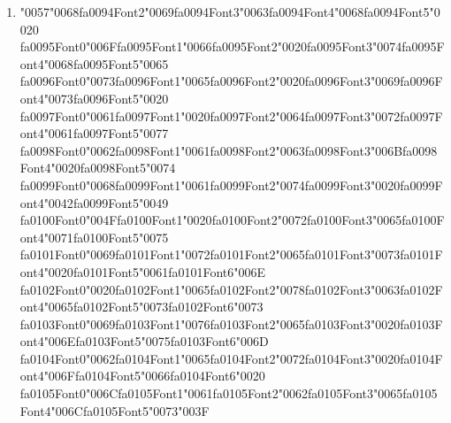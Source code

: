\documentclass[11pt]{article}
\begin{document}
\begin{enumerate}[label=Q\arabic*., leftmargin=*]
\item {\char"0057}{\char"0068}{\csname fa0094Font2\endcsname\char"0069}{\csname fa0094Font3\endcsname\char"0063}{\csname fa0094Font4\endcsname\char"0068}{\csname fa0094Font5\endcsname\char"0020} {\csname fa0095Font0\endcsname\char"006F}{\csname fa0095Font1\endcsname\char"0066}{\csname fa0095Font2\endcsname\char"0020}{\csname fa0095Font3\endcsname\char"0074}{\csname fa0095Font4\endcsname\char"0068}{\csname fa0095Font5\endcsname\char"0065} {\csname fa0096Font0\endcsname\char"0073}{\csname fa0096Font1\endcsname\char"0065}{\csname fa0096Font2\endcsname\char"0020}{\csname fa0096Font3\endcsname\char"0069}{\csname fa0096Font4\endcsname\char"0073}{\csname fa0096Font5\endcsname\char"0020} {\csname fa0097Font0\endcsname\char"0061}{\csname fa0097Font1\endcsname\char"0020}{\csname fa0097Font2\endcsname\char"0064}{\csname fa0097Font3\endcsname\char"0072}{\csname fa0097Font4\endcsname\char"0061}{\csname fa0097Font5\endcsname\char"0077} {\csname fa0098Font0\endcsname\char"0062}{\csname fa0098Font1\endcsname\char"0061}{\csname fa0098Font2\endcsname\char"0063}{\csname fa0098Font3\endcsname\char"006B}{\csname fa0098Font4\endcsname\char"0020}{\csname fa0098Font5\endcsname\char"0074} {\csname fa0099Font0\endcsname\char"0068}{\csname fa0099Font1\endcsname\char"0061}{\csname fa0099Font2\endcsname\char"0074}{\csname fa0099Font3\endcsname\char"0020}{\csname fa0099Font4\endcsname\char"0042}{\csname fa0099Font5\endcsname\char"0049} {\csname fa0100Font0\endcsname\char"004F}{\csname fa0100Font1\endcsname\char"0020}{\csname fa0100Font2\endcsname\char"0072}{\csname fa0100Font3\endcsname\char"0065}{\csname fa0100Font4\endcsname\char"0071}{\csname fa0100Font5\endcsname\char"0075} {\csname fa0101Font0\endcsname\char"0069}{\csname fa0101Font1\endcsname\char"0072}{\csname fa0101Font2\endcsname\char"0065}{\csname fa0101Font3\endcsname\char"0073}{\csname fa0101Font4\endcsname\char"0020}{\csname fa0101Font5\endcsname\char"0061}{\csname fa0101Font6\endcsname\char"006E} {\csname fa0102Font0\endcsname\char"0020}{\csname fa0102Font1\endcsname\char"0065}{\csname fa0102Font2\endcsname\char"0078}{\csname fa0102Font3\endcsname\char"0063}{\csname fa0102Font4\endcsname\char"0065}{\csname fa0102Font5\endcsname\char"0073}{\csname fa0102Font6\endcsname\char"0073} {\csname fa0103Font0\endcsname\char"0069}{\csname fa0103Font1\endcsname\char"0076}{\csname fa0103Font2\endcsname\char"0065}{\csname fa0103Font3\endcsname\char"0020}{\csname fa0103Font4\endcsname\char"006E}{\csname fa0103Font5\endcsname\char"0075}{\csname fa0103Font6\endcsname\char"006D} {\csname fa0104Font0\endcsname\char"0062}{\csname fa0104Font1\endcsname\char"0065}{\csname fa0104Font2\endcsname\char"0072}{\csname fa0104Font3\endcsname\char"0020}{\csname fa0104Font4\endcsname\char"006F}{\csname fa0104Font5\endcsname\char"0066}{\csname fa0104Font6\endcsname\char"0020} {\csname fa0105Font0\endcsname\char"006C}{\csname fa0105Font1\endcsname\char"0061}{\csname fa0105Font2\endcsname\char"0062}{\csname fa0105Font3\endcsname\char"0065}{\csname fa0105Font4\endcsname\char"006C}{\csname fa0105Font5\endcsname\char"0073}{\char"003F}\\[0.25em]

\end{enumerate}
\end{document}
